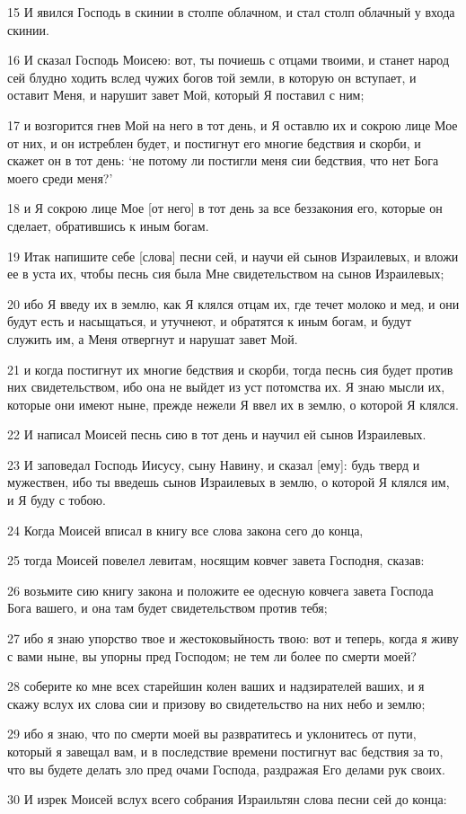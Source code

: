 \par 15 И явился Господь в скинии в столпе облачном, и стал столп облачный у входа скинии.
\par 16 И сказал Господь Моисею: вот, ты почиешь с отцами твоими, и станет народ сей блудно ходить вслед чужих богов той земли, в которую он вступает, и оставит Меня, и нарушит завет Мой, который Я поставил с ним;
\par 17 и возгорится гнев Мой на него в тот день, и Я оставлю их и сокрою лице Мое от них, и он истреблен будет, и постигнут его многие бедствия и скорби, и скажет он в тот день: `не потому ли постигли меня сии бедствия, что нет Бога моего среди меня?'
\par 18 и Я сокрою лице Мое [от него] в тот день за все беззакония его, которые он сделает, обратившись к иным богам.
\par 19 Итак напишите себе [слова] песни сей, и научи ей сынов Израилевых, и вложи ее в уста их, чтобы песнь сия была Мне свидетельством на сынов Израилевых;
\par 20 ибо Я введу их в землю, как Я клялся отцам их, где течет молоко и мед, и они будут есть и насыщаться, и утучнеют, и обратятся к иным богам, и будут служить им, а Меня отвергнут и нарушат завет Мой.
\par 21 и когда постигнут их многие бедствия и скорби, тогда песнь сия будет против них свидетельством, ибо она не выйдет из уст потомства их. Я знаю мысли их, которые они имеют ныне, прежде нежели Я ввел их в землю, о которой Я клялся.
\par 22 И написал Моисей песнь сию в тот день и научил ей сынов Израилевых.
\par 23 И заповедал Господь Иисусу, сыну Навину, и сказал [ему]: будь тверд и мужествен, ибо ты введешь сынов Израилевых в землю, о которой Я клялся им, и Я буду с тобою.
\par 24 Когда Моисей вписал в книгу все слова закона сего до конца,
\par 25 тогда Моисей повелел левитам, носящим ковчег завета Господня, сказав:
\par 26 возьмите сию книгу закона и положите ее одесную ковчега завета Господа Бога вашего, и она там будет свидетельством против тебя;
\par 27 ибо я знаю упорство твое и жестоковыйность твою: вот и теперь, когда я живу с вами ныне, вы упорны пред Господом; не тем ли более по смерти моей?
\par 28 соберите ко мне всех старейшин колен ваших и надзирателей ваших, и я скажу вслух их слова сии и призову во свидетельство на них небо и землю;
\par 29 ибо я знаю, что по смерти моей вы развратитесь и уклонитесь от пути, который я завещал вам, и в последствие времени постигнут вас бедствия за то, что вы будете делать зло пред очами Господа, раздражая Его делами рук своих.
\par 30 И изрек Моисей вслух всего собрания Израильтян слова песни сей до конца:


